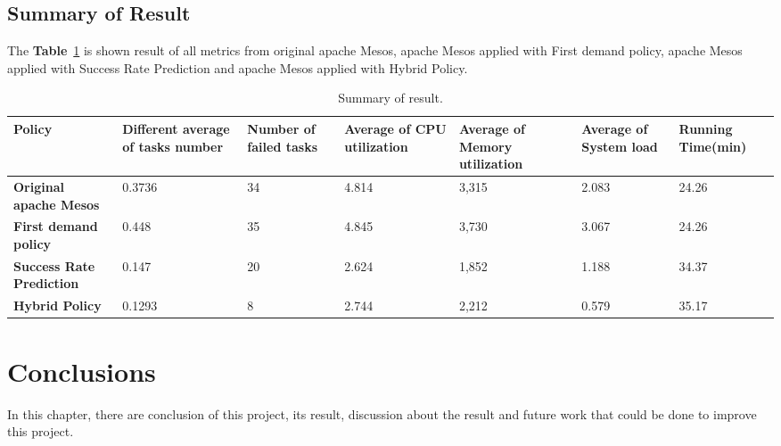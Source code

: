 \documentclass[12pt,oneside,openright,a4paper]{cpe-english-project}
\begin{document}
\section{Summary of Result}  
\hspace{10mm}The \textbf{Table}~\ref{tbl:chap4Sum} is shown result of all metrics from original apache Mesos, apache Mesos applied with First demand policy, apache Mesos applied with Success Rate Prediction and apache Mesos applied with Hybrid Policy.
  \begin{table}[!h]
  \caption{Summary of result.}\label{tbl:chap4Sum}
  \begin{tabular}{@{}|p{}|p{}|p{}|p{}|p{}|p{}|p{}|}
   \hline
   \textbf{Policy} & \textbf{Different average of tasks number} & \textbf{Number of failed tasks} & \textbf{Average of CPU utilization} & \textbf{Average of Memory utilization} & \textbf{Average of System load} & \textbf{Running Time(min)} \\
   \hline
   \textbf{Original apache Mesos}& 0.3736 & 34& 4.814 & 3,315 &2.083& 24.26 \\
   \hline
   \textbf{First demand policy} & 0.448& 35& 4.845& 3,730 & 3.067& 24.26\\
   \hline
   \textbf{Success Rate Prediction}& 0.147& 20& 2.624 & 1,852& 1.188& 34.37 \\
   \hline
   \textbf{Hybrid Policy} & 0.1293 & 8 & 2.744 & 2,212 & 0.579  & 35.17 \\ 
   \hline                   
  \end{tabular}
\end{table}


\chapter{Conclusions}

\hspace{10mm}In this chapter, there are conclusion of this project, its result, discussion about the result and future work that could be done to improve this project.
\end{document}
